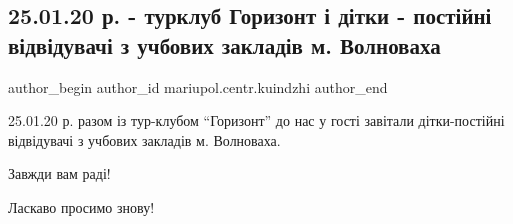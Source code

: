  
 
 
 
 

\subsection{25.01.20 р. - турклуб Горизонт і дітки - постійні відвідувачі з учбових закладів м. Волноваха}
\label{sec:28_01_2020.fb.mariupol.centr.kuindzhi.1.turklub_gorizont_ditky_m_volnovaha}

\ifcmt
 author_begin
   author_id mariupol.centr.kuindzhi
 author_end
\fi

25.01.20 р. разом із тур-клубом \enquote{Горизонт} до нас у гості завітали
дітки-постійні відвідувачі з учбових закладів м. Волноваха.

Завжди вам раді!

Ласкаво просимо знову!
